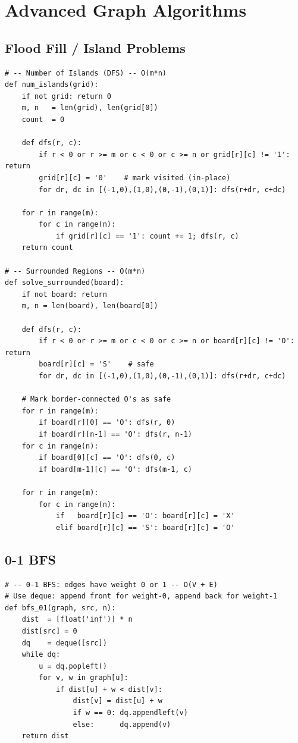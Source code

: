 \documentclass[11pt,a4paper]{report}
\begin{document}
\chapter{Advanced Graph Algorithms}

\section{Flood Fill / Island Problems}

\begin{lstlisting}
# -- Number of Islands (DFS) -- O(m*n)
def num_islands(grid):
    if not grid: return 0
    m, n   = len(grid), len(grid[0])
    count  = 0

    def dfs(r, c):
        if r < 0 or r >= m or c < 0 or c >= n or grid[r][c] != '1': return
        grid[r][c] = '0'    # mark visited (in-place)
        for dr, dc in [(-1,0),(1,0),(0,-1),(0,1)]: dfs(r+dr, c+dc)

    for r in range(m):
        for c in range(n):
            if grid[r][c] == '1': count += 1; dfs(r, c)
    return count

# -- Surrounded Regions -- O(m*n)
def solve_surrounded(board):
    if not board: return
    m, n = len(board), len(board[0])

    def dfs(r, c):
        if r < 0 or r >= m or c < 0 or c >= n or board[r][c] != 'O': return
        board[r][c] = 'S'    # safe
        for dr, dc in [(-1,0),(1,0),(0,-1),(0,1)]: dfs(r+dr, c+dc)

    # Mark border-connected O's as safe
    for r in range(m):
        if board[r][0] == 'O': dfs(r, 0)
        if board[r][n-1] == 'O': dfs(r, n-1)
    for c in range(n):
        if board[0][c] == 'O': dfs(0, c)
        if board[m-1][c] == 'O': dfs(m-1, c)

    for r in range(m):
        for c in range(n):
            if   board[r][c] == 'O': board[r][c] = 'X'
            elif board[r][c] == 'S': board[r][c] = 'O'
\end{lstlisting}

\section{0-1 BFS}

\begin{lstlisting}
# -- 0-1 BFS: edges have weight 0 or 1 -- O(V + E)
# Use deque: append front for weight-0, append back for weight-1
def bfs_01(graph, src, n):
    dist  = [float('inf')] * n
    dist[src] = 0
    dq    = deque([src])
    while dq:
        u = dq.popleft()
        for v, w in graph[u]:
            if dist[u] + w < dist[v]:
                dist[v] = dist[u] + w
                if w == 0: dq.appendleft(v)
                else:      dq.append(v)
    return dist
\end{lstlisting}
\end{document}

